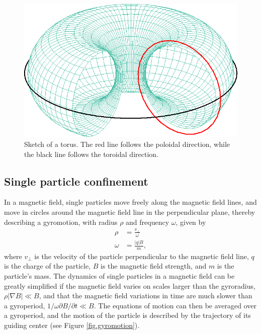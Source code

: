 \documentclass[my_thesis.tex]{subfiles}
\begin{document}
\begin{figure}
    \centering
    \includegraphics[width=.75\linewidth]{images/torus.png}
    \caption{Sketch of a torus. The red line follows the poloidal direction, while the black line follows the toroidal direction.}
    \label{fig.torus}
\end{figure}

\subsection{Single particle confinement}\label{sec.single particle confinement}
In a magnetic field, single particles move freely along the magnetic field lines, and move in circles around the magnetic field line in the perpendicular plane, thereby describing a gyromotion, with radius $\rho$ and frequency $\omega$, given by
\begin{align}
    \rho &= \frac{v_\perp}{\omega}\\
    \omega &= \frac{|q|B}{m},
\end{align}
where $v_\perp$ is the velocity of the particle perpendicular to the magnetic field line, $q$ is the charge of the particle, $B$ is the magnetic field strength, and $m$ is the particle's mass. The dynamics of single particles in a magnetic field can be greatly simplified if the magnetic field varies on scales larger than the gyroradius, $\rho|\nabla B|\ll B$, and that the magnetic field variations in time are much slower than a gyroperiod, $1/\omega \partial B/\partial t \ll B$. The equations of motion can then be averaged over a gyroperiod, and the motion of the particle is described by the trajectory of its guiding center (see Figure \ref{fig.gyromotion}).
\end{document}
